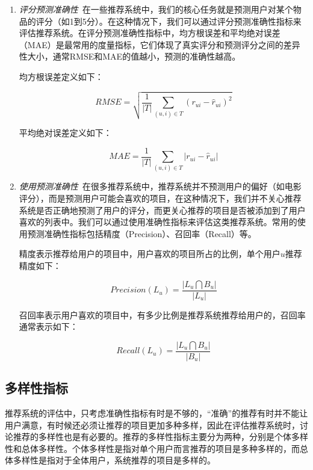 \documentclass[master,winfonts]{njuthesis}
\begin{document}
\begin{enumerate} 

\item \emph{评分预测准确性}~在一些推荐系统中，我们的核心任务就是预测用户对某个物品的评分（如1到5分）。在这种情况下，我们可以通过评分预测准确性指标来评估推荐系统。在评分预测准确性指标中，均方根误差和平均绝对误差（MAE）是最常用的度量指标，它们体现了真实评分和预测评分之间的差异性大小，通常RMSE和MAE的值越小，预测的准确性越高。

均方根误差定义如下：

\begin{equation}
RMSE=\sqrt{\frac{1}{\left | T \right |}\sum_{(u,i)\in T}(r_{ui}-\hat{r}_{ui})^2 }
\end{equation}

平均绝对误差定义如下：

\begin{equation}
MAE=\frac{1}{\left | T \right |}\sum_{(u,i)\in T}\left | r_{ui}-\hat{r}_{ui} \right |
\end{equation}

\item \emph{使用预测准确性}~在很多推荐系统中，推荐系统并不预测用户的偏好（如电影评分），而是预测用户可能会喜欢的项目，在这种情况下，我们并不关心推荐系统是否正确地预测了用户的评分，而更关心推荐的项目是否被添加到了用户喜欢的列表中。我们可以通过使用准确性指标来评估这类推荐系统。常用的使用预测准确性指标包括精度（Precision）、召回率（Recall）等。

精度表示推荐给用户的项目中，用户喜欢的项目所占的比例，单个用户$u$推荐精度如下：

\begin{equation}
Precision(L_u)=\frac{\left |L_u\bigcap B_u \right |}{\left | L_u \right |}
\end{equation}

召回率表示用户喜欢的项目中，有多少比例是推荐系统推荐给用户的，召回率通常表示如下：

\begin{equation}
Recall(L_u)=\frac{\left |L_u\bigcap B_u \right |}{\left | B_u \right |}
\end{equation}

\end{enumerate}
\subsection{多样性指标}
推荐系统的评估中，只考虑准确性指标有时是不够的，“准确”的推荐有时并不能让用户满意，有时候还必须让推荐的项目更加多种多样，因此在评估推荐系统时，讨论推荐的多样性也是有必要的。推荐的多样性指标主要分为两种，分别是个体多样性和总体多样性。个体多样性是指对单个用户而言推荐的项目是多种多样的，而总体多样性是指对于全体用户，系统推荐的项目是多样的。
\end{document}

